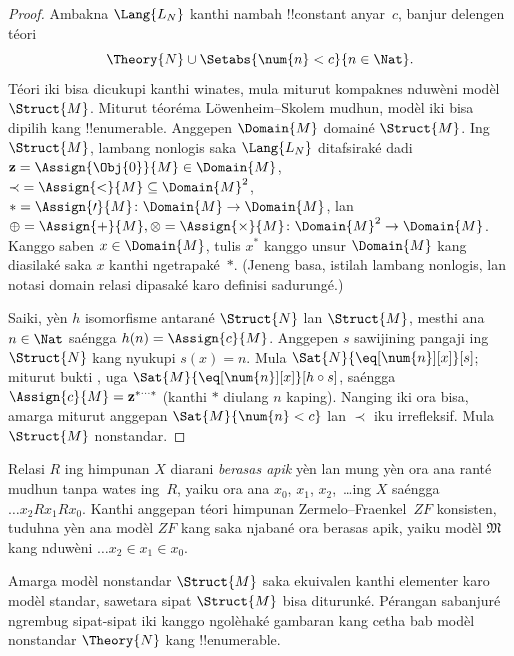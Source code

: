 \documentclass[../../../include/open-logic-section]{subfiles}
\begin{document}
\begin{proof}
Ambakna $\Lang{L_N}$ kanthi nambah !!{constant} anyar~$c$,
banjur delengen téori
\[
\Theory{N} \cup \Setabs{\num{n} < c}{n \in \Nat}.
\]
Téori iki bisa dicukupi kanthi winates, mula miturut
kompaknes nduwèni modèl $\Struct{M}$.
Miturut téoréma L\"owenheim--Skolem mudhun, modèl iki bisa
dipilih kang !!{enumerable}. Anggepen $\Domain{M}$ domainé
$\Struct{M}$. Ing $\Struct{M}$, lambang nonlogis saka
$\Lang{L_N}$ ditafsiraké dadi
$\mathbf{z} = \Assign{\Obj{0}}{M} \in \Domain{M}$,
${\prec} = \Assign{<}{M} \subseteq \Domain{M}^2$,
$* = \Assign{\prime}{M} \colon \Domain{M} \to \Domain{M}$,
lan $\oplus = \Assign{+}{M}, \otimes =
\Assign{\times}{M} \colon \Domain{M}^2 \to \Domain{M}$.
Kanggo saben $x \in \Domain{M}$, tulis $x^*$ kanggo
unsur $\Domain{M}$ kang diasilaké saka $x$ kanthi
ngetrapaké~$*$.
(Jeneng basa, istilah lambang nonlogis, lan notasi domain relasi dipasaké karo definisi sadurungé.)

Saiki, yèn $h$ isomorfisme antarané $\Struct{N}$ lan
$\Struct{M}$, mesthi ana $n \in \Nat$ saéngga
$h(n) = \Assign{c}{M}$. Anggepen $s$ sawijining pangaji
ing $\Struct{N}$ kang nyukupi $s(x) = n$. Mula
$\Sat{N}{\eq[\num{n}][x]}[s]$; miturut bukti
, uga
$\Sat{M}{\eq[\num{n}][x]}[h \circ s]$, saéngga
$\Assign{c}{M} = \mathbf{z}^{*\cdots *}$
(kanthi $*$ diulang $n$ kaping). Nanging iki ora bisa,
amarga miturut anggepan $\Sat{M}{\num{n} < c}$
lan $\prec$ iku irrefleksif. Mula $\Struct{M}$ nonstandar.
\end{proof}

\begin{prob}
Relasi $R$ ing himpunan $X$ diarani \emph{berasas apik} yèn lan
mung yèn ora ana ranté mudhun tanpa wates ing~$R$,
yaiku ora ana $x_0$, $x_1$, $x_2$,~\dots ing $X$ saéngga
$\dots x_2Rx_1Rx_0$. Kanthi anggepan téori himpunan
Zermelo--Fraenkel~$ZF$ konsisten, tuduhna yèn ana
modèl $ZF$ kang saka njabané ora berasas apik,
yaiku modèl $\mathfrak{M}$ kang nduwèni
$\dots x_2 \in x_1 \in x_0$.
\end{prob}

Amarga modèl nonstandar $\Struct{M}$ saka 
ekuivalen kanthi elementer karo modèl standar,
sawetara sipat $\Struct{M}$ bisa diturunké.
Pérangan sabanjuré ngrembug sipat-sipat iki kanggo
ngolèhaké gambaran kang cetha bab modèl nonstandar
$\Theory{N}$ kang !!{enumerable}.
\end{document}
